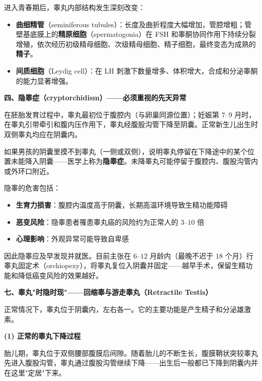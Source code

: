 \vspace{0.3em}

进入青春期后，睾丸内部结构发生深刻改变：
\begin{itemize}
	\item \textbf{曲细精管}（seminiferous tubules）：长度及曲折程度大幅增加，管腔增粗；管壁基底膜上的\textbf{精原细胞}（spermatogonia）在 FSH 和睾酮协同作用下持续分裂增殖，依次经历初级精母细胞、次级精母细胞、精子细胞，最终变态为成熟的\textbf{精子}。
	\item \textbf{间质细胞}（Leydig cell）：在 LH 刺激下数量增多、体积增大，合成和分泌睾酮的能力显著增强。
\end{itemize}

\vspace{0.3em}
\noindent\textbf{四、隐睾症（cryptorchidism）——必须重视的先天异常}

在胚胎发育过程中，睾丸最初位于腹腔内（与卵巢同源位置）；妊娠第 $7$--$9$ 月时，在睾丸引带牵引和腹内压作用下，睾丸经腹股沟管下降至阴囊。正常新生儿出生时双侧睾丸均应在阴囊内。

如果男孩的阴囊里摸不到睾丸（一侧或双侧），说明睾丸停留在下降途中的某个位置未能降入阴囊——医学上称为\textbf{隐睾症}。未降睾丸可能停留于腹腔内、腹股沟管内或外环口附近。

隐睾的危害包括：
\begin{itemize}
	\item \textbf{生育力损害}：腹腔内温度高于阴囊，长期高温环境导致生精功能障碍
	\item \textbf{恶变风险}：隐睾患者罹患睾丸癌的风险约为正常人的 $3$--$10$ 倍
	\item \textbf{心理影响}：外观异常可能导致自卑感
\end{itemize}

因此隐睾应及早发现并就医。目前主张在 $6$--$12$ 月龄内（最晚不迟于 $18$ 个月）行睾丸固定术（orchiopexy），将睾丸复位入阴囊并固定——越早手术，保留生精功能和降低癌变风险的效果越好。

\vspace{0.8em}
\noindent\textbf{七、睾丸"时隐时现"——回缩睾与游走睾丸（Retractile Testis）}

正常情况下，睾丸位于阴囊内，左右各一。它的主要功能是产生精子和分泌雄激素。

\vspace{0.3em}
\noindent\textbf{(1) 正常的睾丸下降过程}

胎儿期，睾丸位于双侧腰部腹膜后间隙。随着胎儿的不断生长，腹膜鞘状突较睾丸先进入腹股沟管，睾丸通过腹股沟管继续下降——出生后一般都已下降到阴囊内并在这里"定居"下来。

